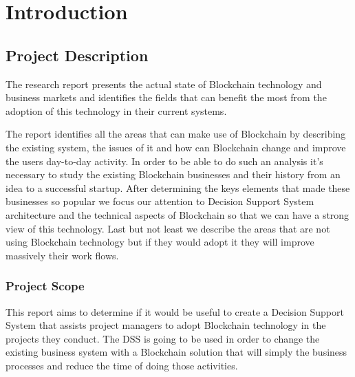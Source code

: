 \chapter{Introduction}
\label{chapter:intro}

\section{Project Description}
\label{sec:intro-section1}
The research report presents the actual state of Blockchain technology and business markets and identifies the fields that can benefit the most from the adoption of this technology in their current systems.

The report identifies all the areas that can make use of Blockchain by describing the existing system, the issues of it and how can Blockchain change and improve the users day-to-day activity. 
In order to be able to do such an analysis it's necessary to study the existing Blockchain businesses and their history from an idea to a successful startup.
After determining the keys elements that made these businesses so popular we focus our attention to Decision Support System architecture and the technical aspects of Blockchain so that we can have a strong view of this technology. Last but not least we describe the areas that are not using Blockchain technology but if they would adopt it they will improve massively their work flows.

\subsection{Project Scope}
\label{sub-sec:intro-subsection1}
This report aims to determine if it would be useful to create a Decision Support System that assists project managers to adopt Blockchain technology in the projects they conduct.
The DSS is going to be used in order to change the existing business system with a Blockchain solution that will simply the business processes and reduce the time of doing those activities.

